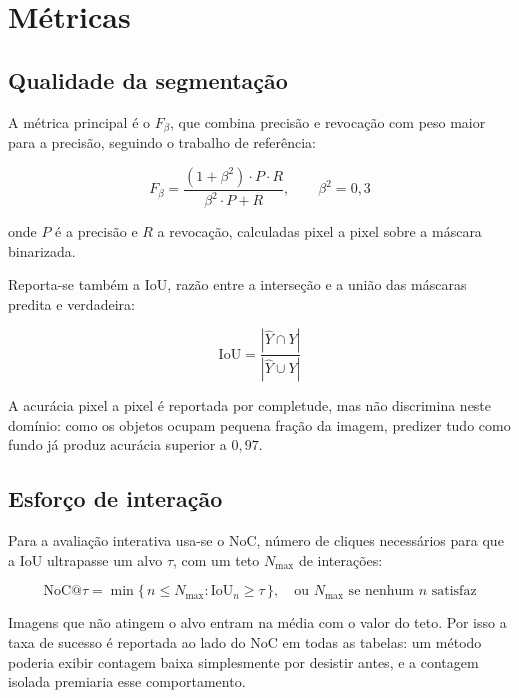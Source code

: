 \section{Métricas}

\subsection{Qualidade da segmentação}

A métrica principal é o $F_\beta$, que combina precisão e revocação com peso maior para a precisão, seguindo o trabalho de referência:

\begin{equation}
F_\beta = \frac{(1 + \beta^2) \cdot P \cdot R}{\beta^2 \cdot P + R}, \qquad \beta^2 = 0{,}3
\label{eq_fbeta}
\end{equation}

onde $P$ é a precisão e $R$ a revocação, calculadas pixel a pixel sobre a máscara binarizada.

Reporta-se também a \ac{IoU}, razão entre a interseção e a união das máscaras predita e verdadeira:

\begin{equation}
\text{IoU} = \frac{|\hat{Y} \cap Y|}{|\hat{Y} \cup Y|}
\label{eq_iou}
\end{equation}

A acurácia pixel a pixel é reportada por completude, mas não discrimina neste domínio: como os objetos ocupam pequena fração da imagem, predizer tudo como fundo já produz acurácia superior a $0{,}97$.

\subsection{Esforço de interação}

Para a avaliação interativa usa-se o \ac{NoC}, número de cliques necessários para que a \ac{IoU} ultrapasse um alvo $\tau$, com um teto $N_{\max}$ de interações:

\begin{equation}
\text{NoC@}\tau = \min\{\,n \leq N_{\max} : \text{IoU}_n \geq \tau\,\},
\quad \text{ou } N_{\max} \text{ se nenhum } n \text{ satisfaz}
\label{eq_noc}
\end{equation}

Imagens que não atingem o alvo entram na média com o valor do teto. Por isso a taxa de sucesso é reportada ao lado do \ac{NoC} em todas as tabelas: um método poderia exibir contagem baixa simplesmente por desistir antes, e a contagem isolada premiaria esse comportamento.

